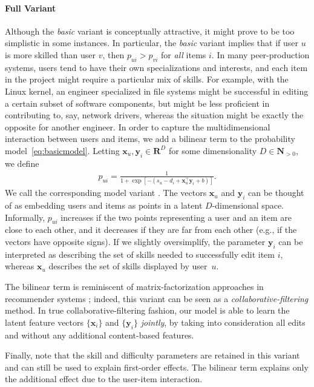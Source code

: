 \paragraph{Full Variant}
Although the \emph{basic} variant is conceptually attractive, it might prove to be too simplistic in some instances.
In particular, the \emph{basic} variant implies that if user $u$ is more skilled than user $v$, then $p_{ui} > p_{vi}$ for \emph{all} items $i$.
In many peer-production systems, users tend to have their own specializations and interests, and each item in the project might require a particular mix of skills.
For example, with the Linux kernel, an engineer specialized in file systems might be successful in editing a certain subset of software components, but might be less proficient in contributing to, say, network drivers, whereas the situation might be exactly the opposite for another engineer.
In order to capture the multidimensional interaction between users and items, we add a bilinear term to the probability model~\eqref{eq:basicmodel}.
Letting $\bm{x}_u, \bm{y}_i \in \mathbf{R}^D$ for some dimensionality $D \in \mathbf{N}_{>0}$, we define
\begin{align}
\label{eq:fullmodel}
p_{ui} = \frac{1}{1 + \exp[-(s_u - d_i + \bm{x}_u^\top \bm{y}_i + b)]}.
\end{align}
We call the corresponding model variant .
The vectors $\bm{x}_u$ and $\bm{y}_i$ can be thought of as embedding users and items as points in a latent $D$-dimensional space.
Informally, $p_{ui}$ increases if the two points representing a user and an item are close to each other, and it decreases if they are far from each other (e.g., if the vectors have opposite signs).
If we slightly oversimplify, the parameter $\bm{y}_i$ can be interpreted as describing the set of skills needed to successfully edit item $i$, whereas $\bm{x}_u$ describes the set of skills displayed by user~$u$.

The bilinear term is reminiscent of matrix-factorization approaches in recommender systems \citep{koren2009matrix};
indeed, this variant can be seen as a \emph{collaborative-filtering} method.
In true collaborative-filtering fashion, our model is able to learn the latent feature vectors $\{ \bm{x}_i \}$ and $\{ \bm{y}_i \}$ \emph{jointly}, by taking into consideration all edits and without any additional content-based features.

Finally, note that the skill and difficulty parameters are retained in this variant and can still be used to explain first-order effects.
The bilinear term explains only the additional effect due to the user-item interaction.

